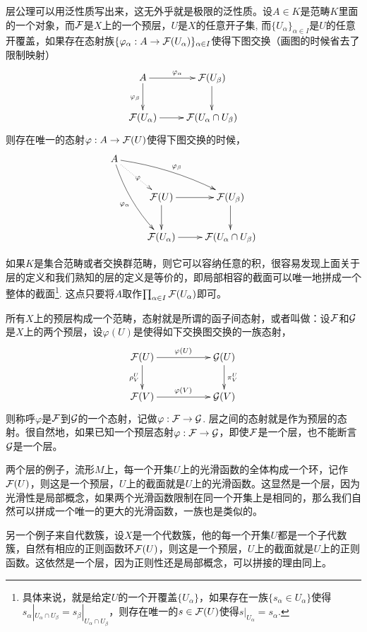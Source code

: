 层公理可以用泛性质写出来，这无外乎就是极限的泛性质。设$A\in K$是范畴$K$里面的一个对象，而$\mathcal{F}$是$X$上的一个预层，$U$是$X$的任意开子集, 而$\{U_\alpha\}_{\alpha\in I}$是$U$的任意开覆盖，如果存在态射族$\{\varphi_\alpha:A\to \mathcal{F}(U_\alpha)\}_{\alpha\in I}$使得下图交换（画图的时候省去了限制映射）
\[
	\xymatrix{
		A\ar[r]^{\varphi_{\alpha}}\ar[d]_{\varphi_{\beta}}&\calf(U_\beta)\ar[d]\\
		\calf(U_\alpha)\ar[r]&\calf(U_{\alpha}\cap U_{\beta})
	}
\]
则存在唯一的态射$\varphi:A\to \mathcal{F}(U)$使得下图交换的时候，
\[
	\xymatrix{
		A\ar@/_/[ddr]_{\varphi_{\alpha}}\ar@/^/[drr]^{\varphi_{\beta}}\ar@{.>}[dr]|{\varphi}&& \\
		&\calf(U)\ar[r]\ar[d]&\calf(U_\beta)\ar[d]\\
		&\calf(U_\alpha)\ar[r]&\calf(U_{\alpha}\cap U_{\beta})
	}
\]

如果$K$是集合范畴或者交换群范畴，则它可以容纳任意的积，很容易发现上面关于层的定义和我们熟知的层的定义是等价的，即局部相容的截面可以唯一地拼成一个整体的截面\footnote{具体来说，就是给定$U$的一个开覆盖$\{U_\alpha\}$，如果存在一族$\{s_\alpha\in U_\alpha\}$使得$s_\alpha|_{U_\alpha\cap U_\beta}=s_\beta|_{U_\alpha\cap U_\beta}$，则存在唯一的$s\in \mathcal{F}(U)$使得$s|_{U_\alpha}=s_\alpha$.}. 这点只要将$A$取作$\prod_{\alpha\in I}\mathcal{F}(U_\alpha)$即可。

\begin{para}
所有$X$上的预层构成一个范畴，态射就是所谓的函子间态射，或者叫做：设$\mathcal{F}$和$\mathcal{G}$是$X$上的两个预层，设$\varphi(U)$是使得如下交换图交换的一族态射，
\[
	\xymatrix{
		\calf(U)\ar[rr]^{\varphi(U)} \ar[d]_{\rho^U_V}&&\calg(U) \ar[d]^{\pi^U_V}\\
		\calf(V)\ar[rr]^{\varphi(V)}&&\calg(V)
	}
\]
则称呼$\varphi$是$\mathcal{F}$到$\mathcal{G}$的一个态射，记做$\varphi:\mathcal{F}\to\mathcal{G}$. 层之间的态射就是作为预层的态射。很自然地，如果已知一个预层态射$\varphi:\mathcal{F}\to\mathcal{G}$，即使$\mathcal{F}$是一个层，也不能断言$\mathcal{G}$是一个层。
\end{para}

\begin{para}
两个层的例子，流形$M$上，每一个开集$U$上的光滑函数的全体构成一个环，记作$\mathcal{F}(U)$，则这是一个预层，$U$上的截面就是$U$上的光滑函数。这显然是一个层，因为光滑性是局部概念，如果两个光滑函数限制在同一个开集上是相同的，那么我们自然可以拼成一个唯一的更大的光滑函数，一族也是类似的。

另一个例子来自代数簇，设$X$是一个代数簇，他的每一个开集$U$都是一个子代数簇，自然有相应的正则函数环$\mathcal{F}(U)$，则这是一个预层，$U$上的截面就是$U$上的正则函数。这依然是一个层，因为正则性还是局部概念，可以拼接的理由同上。
\end{para}

